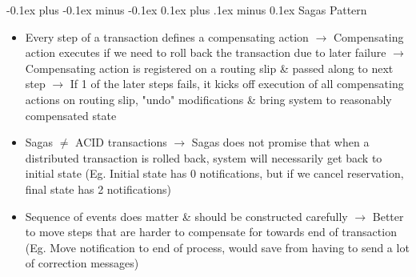 \documentclass[landscape]{article}
\makeatletter
\renewcommand{\subsection}{\@startsection{subsection}{2}{0mm}%
  {-0.1ex plus -0.1ex minus -0.1ex}%
  {0.1ex plus .1ex minus 0.1ex}%
{\normalfont\scriptsize\bfseries}}
\makeatother
\begin{document}
\begin{multicols*}{5}
    \subsection{Sagas Pattern}
    \begin{itemize}
      \item Every step of a transaction defines a compensating action $\rightarrow$ Compensating action executes if we need to roll back the transaction due to later failure $\rightarrow$ Compensating action is registered on a routing slip \& passed along to next step $\rightarrow$ If 1 of the later steps fails, it kicks off execution of all compensating actions on routing slip, "undo" modifications \& bring system to reasonably compensated state 
      \item Sagas $\neq$ ACID transactions $\rightarrow$ Sagas does not promise that when a distributed transaction is rolled back, system will necessarily get back to initial state (Eg. Initial state has 0 notifications, but if we cancel reservation, final state has 2 notifications)
      \item Sequence of events does matter \& should be constructed carefully $\rightarrow$ Better to move steps that are harder to compensate for towards end of transaction (Eg. Move notification to end of process, would save from having to send a lot of correction messages)
    \end{itemize}


\end{multicols*}
\end{document}
